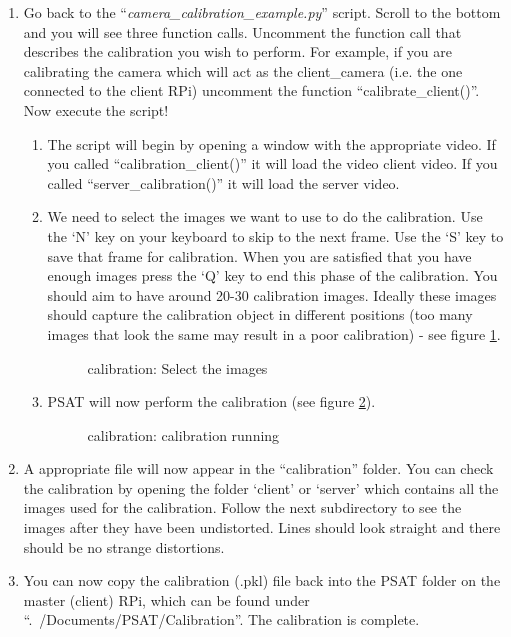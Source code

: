 \documentclass[12pt,a4paper]{report}
\begin{document}
\begin{enumerate}
		\item Go back to the ``\textit{camera\_calibration\_example.py}'' script. Scroll to the bottom and you will see three function calls. Uncomment the function call that describes the calibration you wish to perform. For example, if you are calibrating the camera which will act as the client\_camera (i.e. the one connected to the client RPi) uncomment the function ``calibrate\_client()''. Now execute the script!
		
		\begin{enumerate}
			\item The script will begin by opening a window with the appropriate video. If you called ``calibration\_client()'' it will load the video client video. If you called ``server\_calibration()'' it will load the server video.
			\item We need to select the images we want to use to do the calibration. Use the `N' key on your keyboard to skip to the next frame. Use the `S' key to save that frame for calibration. When you are satisfied that you have enough images press the `Q' key to end this phase of the calibration. You should aim to have around 20-30 calibration images. Ideally these images should capture the calibration object in different positions (too many images that look the same may result in a poor calibration) - see figure \ref{figure: calibration select images}.
			
			\begin{figure}[h]					
				\centering
				\caption{calibration: Select the images}
				\label{figure: calibration select images}	
			\end{figure}
			
			\FloatBarrier
			
			\item PSAT will now perform the calibration (see figure \ref{figure: calibration running}). 
			
			\begin{figure}[h]					
				\centering
				\caption{calibration: calibration running}
				\label{figure: calibration running}	
			\end{figure}
			
			\FloatBarrier
		
			\end{enumerate}
		
		\item A appropriate file will now appear in the ``calibration'' folder. You can check the calibration by opening the folder `client' or `server' which contains all the images used for the calibration. Follow the next subdirectory to see the images after they have been undistorted. Lines should look straight and there should be no strange distortions.
		
		\item You can now copy the calibration (.pkl) file back into the PSAT folder on the master (client) RPi, which can be found under ``.~/Documents/PSAT/Calibration''. The calibration is complete.
		
	\end{enumerate}
\end{document}
